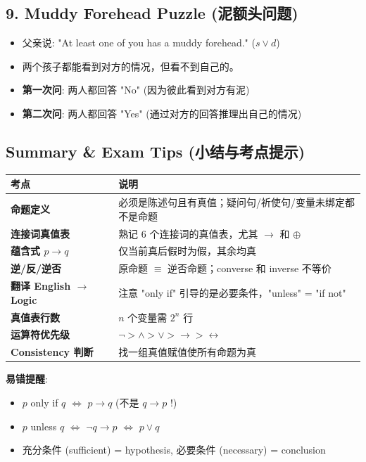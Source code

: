\documentclass[10pt,a4paper,openany]{ctexbook}
\theoremstyle{definition}
\theoremstyle{remark}
\begin{document}
\subsection{9. Muddy Forehead Puzzle (泥额头问题)}

\begin{itemize}
\item 父亲说: "At least one of you has a muddy forehead." ($s \lor d$)
\item 两个孩子都能看到对方的情况，但看不到自己的。
\item \textbf{第一次问}: 两人都回答 "No" (因为彼此看到对方有泥)
\item \textbf{第二次问}: 两人都回答 "Yes" (通过对方的回答推理出自己的情况)

\end{itemize}

\vspace{-2pt}

\subsection{Summary \& Exam Tips (小结与考点提示)}

\begin{center}
\begin{tabular}{ll}
\hline
考点 & 说明 \\ \hline
\textbf{命题定义} & 必须是陈述句且有真值；疑问句/祈使句/变量未绑定都不是命题 \\
\textbf{连接词真值表} & 熟记 6 个连接词的真值表，尤其 $\to$ 和 $\oplus$ \\
\textbf{蕴含式 $p \to q$} & 仅当前真后假时为假，其余均真 \\
\textbf{逆/反/逆否} & 原命题 $\equiv$ 逆否命题；converse 和 inverse 不等价 \\
\textbf{翻译 English $\to$ Logic} & 注意 "only if" 引导的是必要条件，"unless" = "if not" \\
\textbf{真值表行数} & $n$ 个变量需 $2^n$ 行 \\
\textbf{运算符优先级} & $\neg > \land > \lor > \to > \leftrightarrow$ \\
\textbf{Consistency 判断} & 找一组真值赋值使所有命题为真 \\
\hline
\end{tabular}

\end{center}

\textbf{易错提醒}:
\begin{itemize}
\item $p$ only if $q$ $\iff$ $p \to q$ (不是 $q \to p$ !)
\item $p$ unless $q$ $\iff$ $\neg q \to p$ $\iff$ $p \lor q$
\item 充分条件 (sufficient) = hypothesis, 必要条件 (necessary) = conclusion

\end{itemize}
\end{document}
